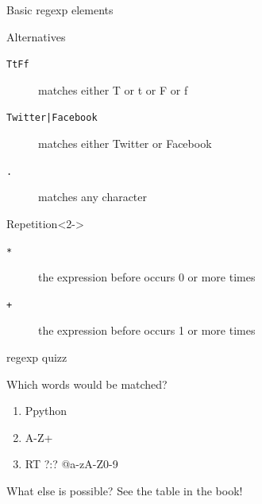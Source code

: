 \documentclass[handout]{beamer}
\begin{document}
\begin{frame}{Basic regexp elements}
\begin{block}{Alternatives}
\begin{description}
\item[{\tt{\lbrack TtFf\rbrack}}] matches either T or t or F or f
\item[{\tt{Twitter|Facebook}}] matches either Twitter or Facebook
\item[{\tt{.}}] matches any character
\end{description}
\end{block}
\begin{block}{Repetition}<2->
\begin{description}
\item[{\tt{*}}] the expression before occurs 0 or more times
\item[{\tt{+}}] the expression before occurs 1 or more times
\end{description}
\end{block}
\end{frame}

\begin{frame}{regexp quizz}
\begin{block}{Which words would be matched?}
\tt
\begin{enumerate}
\item<1-> \lbrack Pp\rbrack ython
\item<2-> \lbrack A-Z\rbrack +
\item<3-> RT ?:? @\lbrack a-zA-Z0-9\rbrack *
\end{enumerate}
\end{block}
\end{frame}

\begin{frame}{What else is possible?}
See the table in the book!
\end{frame}
\end{document}
